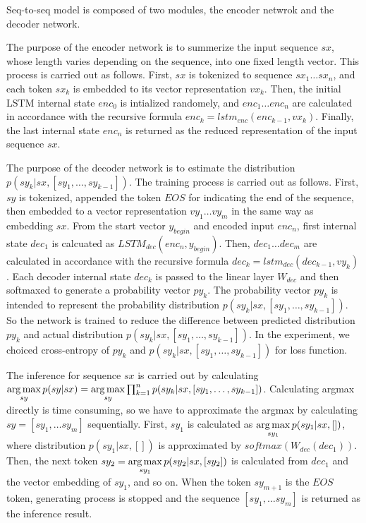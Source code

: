 \documentclass[senior,final,11pt]{iscs-thesis}
\newcommand{\argmax}{\mathop{\rm arg\,max}\limits}
\begin{document}
Seq-to-seq model is composed of two modules, the encoder netwrok and the decoder network.

The purpose of the encoder network is to summerize the input sequence $sx$, whose length varies depending on the sequence, into one fixed length vector.
This process is carried out as follows. 
First, $sx$ is tokenized to sequence $sx_{1} \dots sx_{n}$, and each token $sx_{k}$ is embedded to its vector representation $vx_{k}$. 
Then, the initial LSTM internal state $enc_0$ is intialized randomely, 
and $ enc_{1} \dots enc_{n} $ are calculated in accordance with the recursive formula $ enc_{k} = lstm_{enc}(enc_{k-1},vx_{k}) $.
Finally, the last internal state $ enc_{n}$ is returned as the reduced representation of the input sequence $sx$.

The purpose of the decoder network is to estimate the distribution $ p(sy_k|sx,[sy_1,\dots,sy_{k-1}]) $. 
The training process is carried out as follows. 
First, $sy$ is tokenized, appended the token $ EOS $ for indicating the end of the sequence, then embedded to a vector representation $vy_{1} \dots vy_{m}$ in the same way as embedding $sx$.
From the start vector $y_{begin}$ and encoded input $ enc_{n} $, first internal state $ dec_{1}$ is calcuated as $ LSTM_{dec}(enc_{n},y_{begin}) $.
Then, $ dec_{1} \dots dec_{m} $ are calculated in accordance with the recursive formula $ dec_{k} = lstm_{dec}(dec_{k-1},vy_{k}) $.
Each decoder internal state $ dec_{k} $ is passed to the linear layer $ W_{dec} $ and then softmaxed to generate a probability vector $ py_{k} $.
The probability vector $ py_{k} $ is intended to represent the probability distribution $ p(sy_k|sx,[sy_1,\dots,sy_{k-1}]) $.
So the network is trained to reduce the difference between predicted distribution $ py_{k} $ and actual distribution $ p(sy_k|sx,[sy_1,\dots,sy_{k-1}]) $.
In the experiment, we choiced cross-entropy of $ py_{k} $ and $ p(sy_k|sx,[sy_1,\dots,sy_{k-1}]) $ for loss function.

The inference for sequence $sx$ is carried out by calculating 
$ \argmax_{sy} p(sy|sx) = \argmax_{sy} \prod_{k=1}^n p(sy_k|sx,[sy_1,\dots,sy_{k-1}]) $.
Calculating argmax directly is time consuming, so we have to approximate the argmax by calculating $sy = [sy_1, \dots sy_m]$ sequentially.
First, $sy_1$ is calculated as $ \argmax_{sy_1} p(sy_1|sx,[]) $, where distribution $ p(sy_1|sx,[]) $ is approximated by 
$ softmax(W_{dec}(dec_{1}))$. 
Then, the next token $sy_2 = \argmax_{sy_1} p(sy_2|sx,[sy_2]) $ is calculated from $ dec_{1} $ and the vector embedding of $sy_1$, and so on.
When the token $sy_{m+1}$ is the $ EOS $ token, generating process is stopped and the sequence $ [sy_1, \dots sy_m]$ is returned as the inference result.
\end{document}
